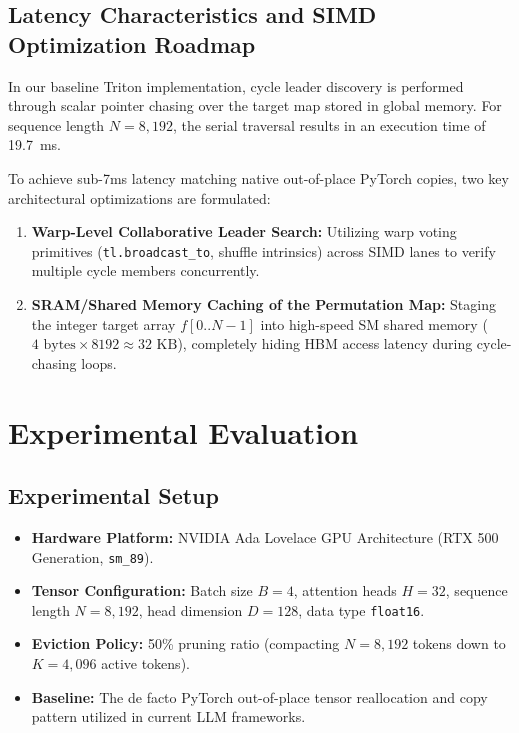 \documentclass[journal,10pt,twocolumn]{article}
\begin{document}
\subsection{Latency Characteristics and SIMD Optimization Roadmap}
In our baseline Triton implementation, cycle leader discovery is performed through scalar pointer chasing over the target map stored in global memory. For sequence length $N = 8,192$, the serial traversal results in an execution time of 19.7~ms. 

To achieve sub-7ms latency matching native out-of-place PyTorch copies, two key architectural optimizations are formulated:
\begin{enumerate}
    \item \textbf{Warp-Level Collaborative Leader Search:} Utilizing warp voting primitives (\texttt{tl.broadcast\_to}, shuffle intrinsics) across SIMD lanes to verify multiple cycle members concurrently.
    \item \textbf{SRAM/Shared Memory Caching of the Permutation Map:} Staging the integer target array $f[0..N-1]$ into high-speed SM shared memory ($4 \text{ bytes} \times 8192 \approx 32\text{ KB}$), completely hiding HBM access latency during cycle-chasing loops.
\end{enumerate}

\section{Experimental Evaluation}
\label{sec:eval}

\subsection{Experimental Setup}
\begin{itemize}
    \item \textbf{Hardware Platform:} NVIDIA Ada Lovelace GPU Architecture (RTX 500 Generation, \texttt{sm\_89}).
    \item \textbf{Tensor Configuration:} Batch size $B = 4$, attention heads $H = 32$, sequence length $N = 8,192$, head dimension $D = 128$, data type \texttt{float16}.
    \item \textbf{Eviction Policy:} 50\% pruning ratio (compacting $N = 8,192$ tokens down to $K = 4,096$ active tokens).
    \item \textbf{Baseline:} The de facto PyTorch out-of-place tensor reallocation and copy pattern utilized in current LLM frameworks.
\end{itemize}
\end{document}
